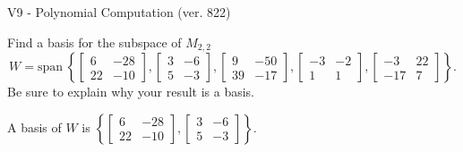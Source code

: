 \begin{exercise}
  \begin{exerciseTitle}V9 - Polynomial Computation (ver. 822)\end{exerciseTitle}
  \begin{exerciseStatement}
    Find a basis for the subspace of \(M_{2,2}\) 
\[W=\mathrm{span}\ \left\{\left[\begin{array}{cc}
6 & -28 \\
22 & -10
\end{array}\right] , \left[\begin{array}{cc}
3 & -6 \\
5 & -3
\end{array}\right] , \left[\begin{array}{cc}
9 & -50 \\
39 & -17
\end{array}\right] , \left[\begin{array}{cc}
-3 & -2 \\
1 & 1
\end{array}\right] , \left[\begin{array}{cc}
-3 & 22 \\
-17 & 7
\end{array}\right]\right\}.\]
 Be sure to explain why your result is a basis.


  \end{exerciseStatement}
  \begin{exerciseAnswer}
   A basis of \(W\) is  \(\left\{\left[\begin{array}{cc}
6 & -28 \\
22 & -10
\end{array}\right] , \left[\begin{array}{cc}
3 & -6 \\
5 & -3
\end{array}\right]\right\}\).
  


  \end{exerciseAnswer}
\end{exercise}